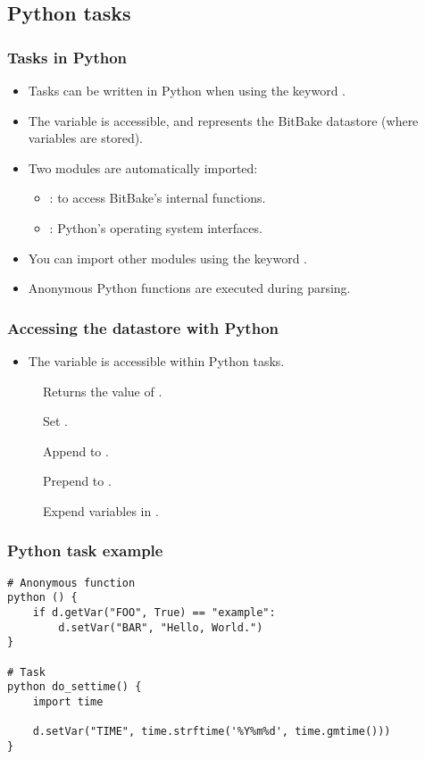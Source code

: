 \subsection{Python tasks}

\begin{frame}
  \frametitle{Tasks in Python}
  \begin{itemize}
    \item Tasks can be written in Python when using the keyword
      .
    \item The  variable is accessible, and represents the
      BitBake datastore (where variables are stored).
    \item Two modules are automatically imported:
      \begin{itemize}
        \item {}: to access BitBake's internal functions.
        \item {}: Python's operating system interfaces.
      \end{itemize}
    \item You can import other modules using the keyword
      .
    \item Anonymous Python functions are executed during parsing.
  \end{itemize}
\end{frame}

\begin{frame}
  \frametitle{Accessing the datastore with Python}
  \begin{itemize}
    \item The  variable is accessible within Python tasks.
  \end{itemize}
  \begin{description}
    \item[] Returns the value of
      .
    \item[] Set .
    \item[] Append  to
      .
    \item[] Prepend  to
      .
    \item[] Expend variables in
      .
  \end{description}
\end{frame}

\begin{frame}[fragile]
  \frametitle{Python task example}
  \begin{verbatim}
# Anonymous function
python () {
    if d.getVar("FOO", True) == "example":
        d.setVar("BAR", "Hello, World.")
}

# Task
python do_settime() {
    import time

    d.setVar("TIME", time.strftime('%Y%m%d', time.gmtime()))
}
  \end{verbatim}
\end{frame}

